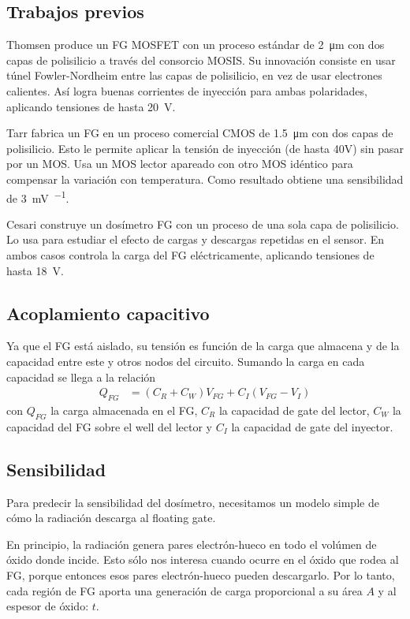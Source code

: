 \subsection{Trabajos previos}
Thomsen\cite{thomsen_floating-gate_1991} produce un FG MOSFET
con un proceso estándar de \SI{2}{\micro\meter} con dos capas de polisilicio
a través del consorcio MOSIS\cite{noauthor_mosis_nodate}.
Su innovación consiste en usar túnel Fowler-Nordheim entre las capas de
polisilicio, en vez de usar electrones calientes. 
Así logra buenas corrientes de inyección para ambas polaridades,
aplicando tensiones de hasta \SI{20}{\volt}.

Tarr\cite{tarr_sensitive_2004} fabrica un FG en un proceso comercial CMOS
de \SI{1.5}{\micro\meter} con dos capas de polisilicio. 
Esto le permite aplicar la tensión de inyección 
(de hasta 40V) sin pasar por un MOS.
Usa un MOS lector apareado con otro MOS idéntico para compensar 
la variación con temperatura.
Como resultado obtiene una sensibilidad de \SI{3}{\milli\volt\per\rad}.

Cesari\cite{cesari_floating_2014} construye un dosímetro FG 
con un proceso de una sola capa de polisilicio.
Lo usa para estudiar el efecto de cargas y descargas repetidas
en el sensor.
En ambos casos controla la carga del FG eléctricamente,
aplicando tensiones de hasta \SI{18}{\volt}.

%
\subsection{Acoplamiento capacitivo}
Ya que el FG está aislado,
su tensión es función de la carga que almacena 
y de la capacidad entre este y otros nodos del circuito.
Sumando la carga en cada capacidad se llega a la relación
\begin{align}
    Q_{FG} &= (C_R + C_W) V_{FG} + C_I (V_{FG}-V_I)
    \label{eq:ccoupling}
\end{align}
con $Q_{FG}$ la carga almacenada en el FG, $C_R$ la capacidad de gate del
lector, $C_W$ la capacidad del FG sobre el well del lector y $C_I$ la capacidad
de gate del inyector.
\subsection{Sensibilidad}
Para predecir la sensibilidad del dosímetro,
necesitamos un modelo simple de cómo la radiación
descarga al floating gate.

En principio, la radiación genera pares electrón-hueco
en todo el volúmen de óxido donde incide.
Esto sólo nos interesa cuando ocurre en el óxido que rodea al FG,
porque entonces esos pares electrón-hueco pueden descargarlo.
Por lo tanto, cada región de FG aporta una generación de carga
proporcional a su área $A$ y al espesor de óxido: $t$.

